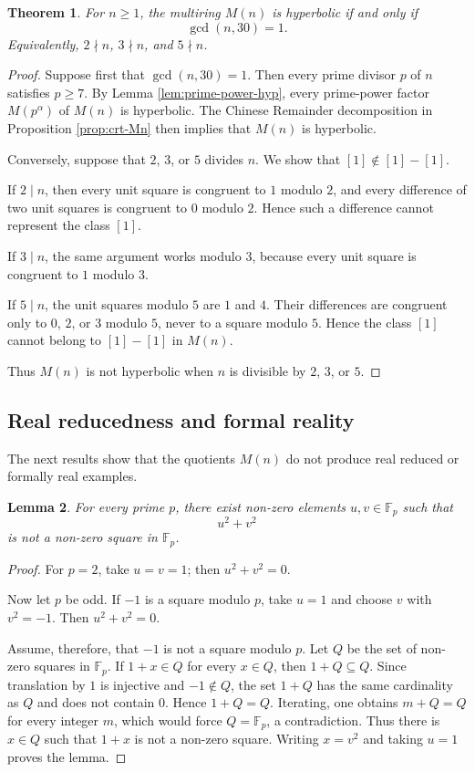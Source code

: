 \documentclass[a4paper,10pt]{article}
\newtheorem{teo}{Theorem}[section]
\newtheorem{lem}[teo]{Lemma} %
\newcommand{\cl}[1]{\left[#1\right]}
\begin{document}
\begin{teo}\label{teo:hyperbolic}
For $n\ge1$, the multiring $M(n)$ is hyperbolic if and only if
\[
        \gcd(n,30)=1.
\]
Equivalently, $2\nmid n$, $3\nmid n$, and $5\nmid n$.
\end{teo}

\begin{proof}
Suppose first that $\gcd(n,30)=1$.  Then every prime divisor $p$ of $n$ satisfies $p\ge7$.  By Lemma \ref{lem:prime-power-hyp}, every prime-power factor $M(p^\alpha)$ of $M(n)$ is hyperbolic.  The Chinese Remainder decomposition in Proposition \ref{prop:crt-Mn} then implies that $M(n)$ is hyperbolic.

Conversely, suppose that $2$, $3$, or $5$ divides $n$.  We show that $\cl1\notin\cl1-\cl1$.

If $2\mid n$, then every unit square is congruent to $1$ modulo $2$, and every difference of two unit squares is congruent to $0$ modulo $2$.  Hence such a difference cannot represent the class $\cl1$.

If $3\mid n$, the same argument works modulo $3$, because every unit square is congruent to $1$ modulo $3$.

If $5\mid n$, the unit squares modulo $5$ are $1$ and $4$.  Their differences are congruent only to $0$, $2$, or $3$ modulo $5$, never to a square modulo $5$.  Hence the class $\cl1$ cannot belong to $\cl1-\cl1$ in $M(n)$.

Thus $M(n)$ is not hyperbolic when $n$ is divisible by $2$, $3$, or $5$.
\end{proof}

\subsection{Real reducedness and formal reality}

The next results show that the quotients $M(n)$ do not produce real reduced or formally real examples.

\begin{lem}\label{lem:two-squares-local}
For every prime $p$, there exist non-zero elements $u,v\in\mathbb F_p$ such that
\[
        u^2+v^2
\]
is not a non-zero square in $\mathbb F_p$.
\end{lem}

\begin{proof}
For $p=2$, take $u=v=1$; then $u^2+v^2=0$.

Now let $p$ be odd.  If $-1$ is a square modulo $p$, take $u=1$ and choose $v$ with $v^2=-1$.  Then $u^2+v^2=0$.

Assume, therefore, that $-1$ is not a square modulo $p$.  Let $Q$ be the set of non-zero squares in $\mathbb F_p$.  If $1+x\in Q$ for every $x\in Q$, then $1+Q\subseteq Q$.  Since translation by $1$ is injective and $-1\notin Q$, the set $1+Q$ has the same cardinality as $Q$ and does not contain $0$.  Hence $1+Q=Q$.  Iterating, one obtains $m+Q=Q$ for every integer $m$, which would force $Q=\mathbb F_p$, a contradiction.  Thus there is $x\in Q$ such that $1+x$ is not a non-zero square.  Writing $x=v^2$ and taking $u=1$ proves the lemma.
\end{proof}
\end{document}
